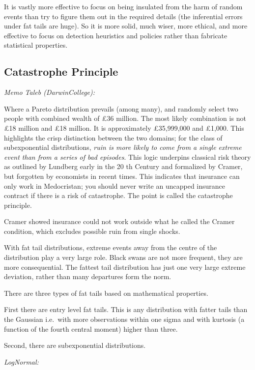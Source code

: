 \documentclass[
]{book}
\begin{document}
It is vastly more effective
to focus on being insulated from the harm of random events
than try to figure them out in the required details
(the inferential errors under fat tails are huge).
So it is more solid, much wiser, more ethical, and more effective to focus on
detection heuristics and policies rather than fabricate statistical properties.

\hypertarget{catastrophe-principle}{%
\subsection{Catastrophe Principle}\label{catastrophe-principle}}

\emph{Memo Taleb (DarwinCollege):}

Where a Pareto distribution
prevails (among many), and randomly select two people with
combined wealth of £36 million. The most likely combination
is not £18 million and £18 million. It is approximately
£35,999,000 and £1,000. This highlights the crisp distinction
between the two domains; for the class of subexponential
distributions, \emph{ruin is more likely to come from a single extreme
event than from a series of bad episodes}. This logic underpins
classical risk theory as outlined by Lundberg early in the 20 th
Century and formalized by Cramer, but forgotten by
economists in recent times. This indicates that insurance can
only work in Medocristan; you should never write an uncapped
insurance contract if there is a risk of catastrophe. The point
is called the catastrophe principle.

Cramer showed insurance could not work outside
what he called the Cramer condition, which excludes possible
ruin from single shocks.

With fat tail distributions, extreme events
away from the centre of the distribution play a very large
role. Black swans are not more frequent, they are more
consequential. The fattest tail distribution has just one very
large extreme deviation, rather than many departures form the
norm.

There are three types of fat tails based on mathematical properties.

First there are entry level fat tails.
This is any distribution with fatter tails than the Gaussian
i.e.~with more observations within one sigma and with
kurtosis (a function of the fourth central moment) higher than three.

Second, there are subexponential distributions.

\emph{LogNormal:}
\end{document}
